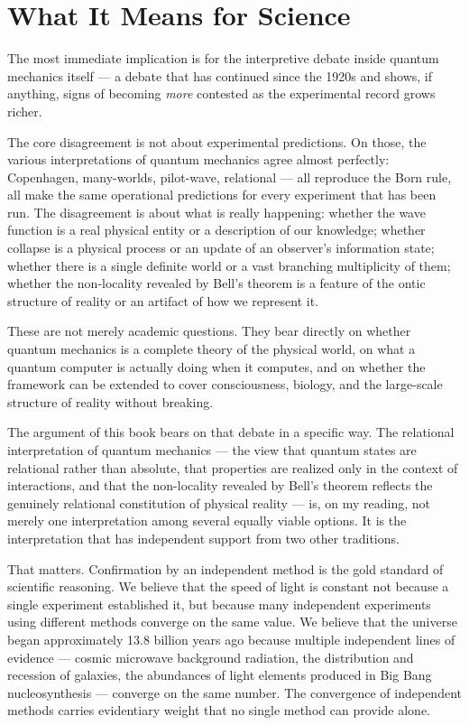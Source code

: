 \section{What It Means for Science}
\label{sec:ch15-science}

The most immediate implication is for the interpretive debate inside quantum
mechanics itself --- a debate that has continued since the 1920s and shows,
if anything, signs of becoming \emph{more} contested as the experimental
record grows richer.

The core disagreement is not about experimental predictions.  On those, the
various interpretations of quantum mechanics agree almost perfectly: Copenhagen,
many-worlds, pilot-wave, relational --- all reproduce the Born rule, all make
the same operational predictions for every experiment that has been run.  The
disagreement is about what is really happening: whether the wave function is a
real physical entity or a description of our knowledge; whether collapse is a
physical process or an update of an observer's information state; whether there
is a single definite world or a vast branching multiplicity of them; whether
the non-locality revealed by Bell's theorem is a feature of the ontic structure
of reality or an artifact of how we represent it.

These are not merely academic questions.  They bear directly on whether quantum
mechanics is a complete theory of the physical world, on what a quantum computer
is actually doing when it computes, and on whether the framework can be extended
to cover consciousness, biology, and the large-scale structure of reality without
breaking.

The argument of this book bears on that debate in a specific way.  The relational
interpretation of quantum mechanics --- the view that quantum states are
relational rather than absolute, that properties are realized only in the context
of interactions, and that the non-locality revealed by Bell's theorem reflects
the genuinely relational constitution of physical reality --- is, on my reading,
not merely one interpretation among several equally viable options.  It is the
interpretation that has independent support from two other traditions.

That matters.  Confirmation by an independent method is the gold standard of
scientific reasoning.  We believe that the speed of light is constant not because
a single experiment established it, but because many independent experiments using
different methods converge on the same value.  We believe that the universe began
approximately 13.8 billion years ago because multiple independent lines of
evidence --- cosmic microwave background radiation, the distribution and recession
of galaxies, the abundances of light elements produced in Big Bang
nucleosynthesis --- converge on the same number.  The convergence of independent
methods carries evidentiary weight that no single method can provide alone.

